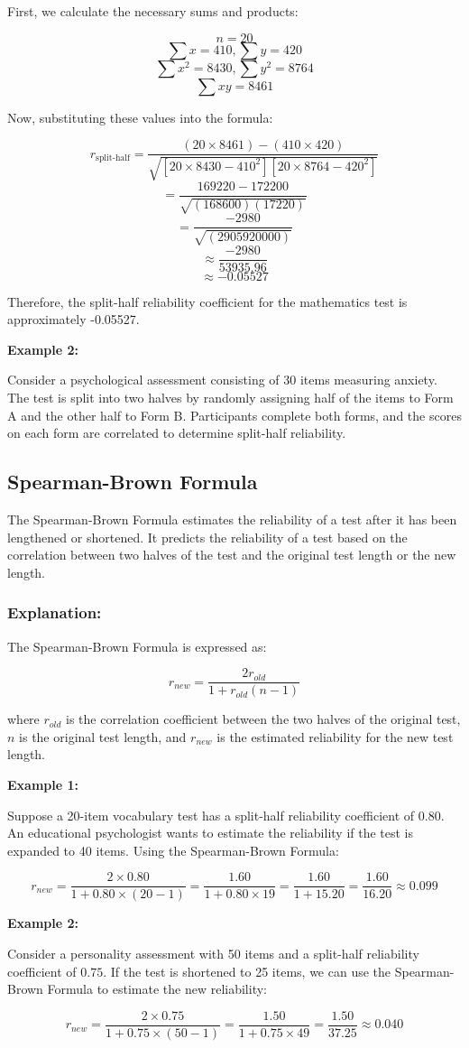 \documentclass[12pt, a4paper]{exam}
\begin{document}
First, we calculate the necessary sums and products:

\[
n = 20
\]
\[
\sum x = 410, \sum y = 420
\]
\[
\sum x^2 = 8430, \sum y^2 = 8764
\]
\[
\sum xy = 8461
\]

Now, substituting these values into the formula:

\[
r_{\text{split-half}} = \frac{(20 \times 8461) - (410 \times 420)}{\sqrt{[20 \times 8430 - 410^2][20 \times 8764 - 420^2]}}
\]
\[
= \frac{169220 - 172200}{\sqrt{(168600)(17220)}}
\]
\[
= \frac{-2980}{\sqrt{(2905920000)}}
\]
\[
\approx \frac{-2980}{53935.96}
\]
\[
\approx -0.05527
\]

Therefore, the split-half reliability coefficient for the mathematics test is approximately -0.05527.


\textbf{Example 2:}

Consider a psychological assessment consisting of 30 items measuring anxiety. The test is split into two halves by randomly assigning half of the items to Form A and the other half to Form B. Participants complete both forms, and the scores on each form are correlated to determine split-half reliability.

\subsection{Spearman-Brown Formula}

The Spearman-Brown Formula estimates the reliability of a test after it has been lengthened or shortened. It predicts the reliability of a test based on the correlation between two halves of the test and the original test length or the new length.

\subsubsection{Explanation:}

The Spearman-Brown Formula is expressed as:

\[
r_{new} = \frac{2r_{old}}{1 + r_{old}(n - 1)}
\]

where \(r_{old}\) is the correlation coefficient between the two halves of the original test, \(n\) is the original test length, and \(r_{new}\) is the estimated reliability for the new test length.

\textbf{Example 1:}

Suppose a 20-item vocabulary test has a split-half reliability coefficient of \(0.80\). An educational psychologist wants to estimate the reliability if the test is expanded to 40 items. Using the Spearman-Brown Formula:

\[
r_{new} = \frac{2 \times 0.80}{1 + 0.80 \times (20 - 1)} = \frac{1.60}{1 + 0.80 \times 19} = \frac{1.60}{1 + 15.20} = \frac{1.60}{16.20} \approx 0.099
\]

\textbf{Example 2:}

Consider a personality assessment with 50 items and a split-half reliability coefficient of \(0.75\). If the test is shortened to 25 items, we can use the Spearman-Brown Formula to estimate the new reliability:

\[
r_{new} = \frac{2 \times 0.75}{1 + 0.75 \times (50 - 1)} = \frac{1.50}{1 + 0.75 \times 49} = \frac{1.50}{37.25} \approx 0.040
\]
\end{document}
